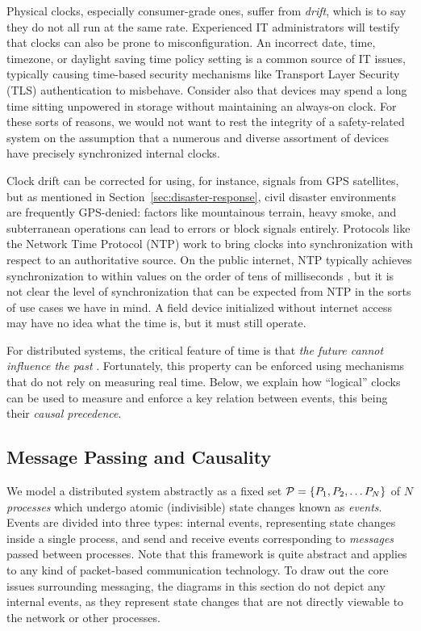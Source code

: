 \documentclass[]             %
{NASA}                       %
\theoremstyle{definition}
\begin{document}
Physical clocks, especially consumer-grade ones, suffer from
\emph{drift}, which is to say they do not all run at the same
rate. Experienced IT administrators will testify that clocks can also
be prone to misconfiguration. An incorrect date, time, timezone, or
daylight saving time policy setting is a common source of IT issues,
typically causing time-based security mechanisms like Transport Layer Security (TLS)
authentication to misbehave. Consider also that devices may spend a
long time sitting unpowered in storage without maintaining an
always-on clock. For these sorts of reasons, we would not want to rest
the integrity of a safety-related system on the assumption that a
numerous and diverse assortment of devices have precisely synchronized
internal clocks.

Clock drift can be corrected for using, for instance, signals from GPS
satellites, but as mentioned in Section~\ref{sec:disaster-response},
civil disaster environments are frequently GPS-denied: factors like
mountainous terrain, heavy smoke, and subterranean operations can lead
to errors or block signals entirely. Protocols like the Network Time
Protocol (NTP) \cite{rfc1119} work to bring clocks into
synchronization with respect to an authoritative source. On the public
internet, NTP typically achieves synchronization to within values on the
order of tens of milliseconds \cite{rfc1128}, but it is not clear the
level of synchronization that can be expected from NTP in the sorts of use
cases we have in mind. A field device initialized without internet
access may have no idea what the time is, but it must still operate.

For distributed systems, the critical feature of time is that
\emph{the future cannot influence the past}
\cite{1989mattern}. Fortunately, this property can be
enforced using mechanisms that do not rely on measuring real
time. Below, we explain how ``logical'' clocks can be used to
measure and enforce a key relation between events, this being their
\emph{causal precedence}.


\subsection{Message Passing and Causality}
\label{ssec:message-passing}
We model a distributed system abstractly as a fixed set
$\mathcal{P} = \{P_1, P_2, \ldots P_N\}$ of $N$ \emph{processes} which
undergo atomic (indivisible) state changes known as
\emph{events}. Events are divided into three types: internal events,
representing state changes inside a single process, and send and
receive events corresponding to \emph{messages} passed between
processes. Note that this framework is quite abstract and applies to
any kind of packet-based communication technology. To draw out the
core issues surrounding messaging, the diagrams in this section do not
depict any internal events, as they represent state changes that are
not directly viewable to the network or other processes.
\end{document}
